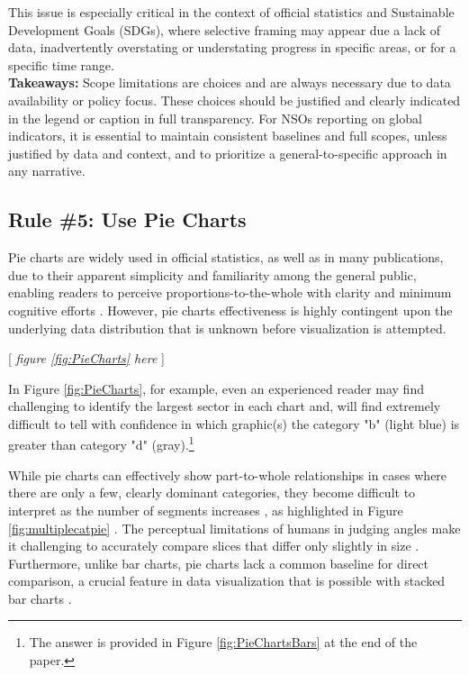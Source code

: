 \documentclass[11pt,twoside,a4paper]{article}
\begin{document}
This issue is especially critical in the context of official statistics and Sustainable Development Goals (SDGs), where selective framing may appear due a lack of data, inadvertently overstating or understating progress in specific areas, or for a specific time range.\\

\noindent \textbf{ Takeaways:} Scope limitations are choices and are always necessary due to data availability or policy focus. These choices should be justified and clearly indicated in the legend or caption in full transparency.  For NSOs reporting on global indicators, it is essential to maintain consistent baselines and full scopes, unless justified by data and context, and to prioritize a general-to-specific approach in any narrative. 

\subsection*{Rule \#5: Use Pie Charts}

Pie charts are widely used in official statistics, as well as in many publications, due to their apparent simplicity and familiarity among the general public, enabling readers to perceive proportions-to-the-whole with clarity and minimum cognitive efforts \citep{cairo2016truthful}. However, pie charts effectiveness is highly contingent upon the underlying data distribution  that is unknown before visualization is attempted. 

\begin{center}
    [ \textit{figure \ref{fig:PieCharts}  here}  ]
\end{center}


In Figure \ref{fig:PieCharts}, for example,  even an experienced reader may find challenging to identify the largest sector in each chart and, will find extremely difficult to tell with confidence in which graphic(s) the category "b" (light blue)  is greater than category "d" (gray).\footnote{The answer is provided in Figure \ref{fig:PieChartsBars} at the end of the paper.}

While pie charts can effectively show part-to-whole relationships in cases where there are only a few, clearly dominant categories, they become difficult to interpret as the number of segments increases \citep{few2007Pies}, as highlighted in Figure \ref{fig:multiplecatpie} . The perceptual limitations of humans in judging angles make it challenging to accurately compare slices that differ only slightly in size \citep{Cleveland1984}. Furthermore, unlike bar charts, pie charts lack a common baseline for direct comparison, a crucial feature in data visualization that is possible with stacked bar charts \citep{wong2013}.
\end{document}

